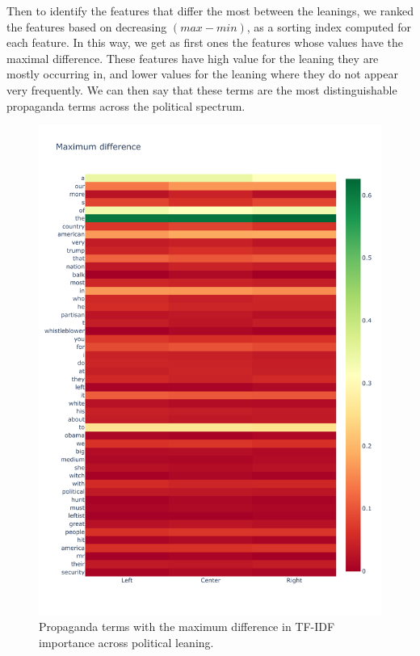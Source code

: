 Then to identify the features that differ the most between the leanings, we ranked the features based on decreasing $(max - min)$, as a sorting index computed for each feature. In this way, we get as first ones the features whose values have the maximal difference.
These features have high value for the leaning they are mostly occurring in, and lower values for the leaning where they do not appear very frequently.
We can then say that these terms are the most distinguishable propaganda terms across the political spectrum.

\begin{figure}[!htbp]
    \centering
    \includegraphics[trim={0 0 0 2cm},clip,width=\linewidth]{figures/baly_prop_tech_words_all_across_leaning.pdf}
    \caption{Propaganda terms with the maximum difference in TF-IDF importance across political leaning.}
    \label{fig:baly_prop_tech_words_all_across_leaning}
\end{figure}

